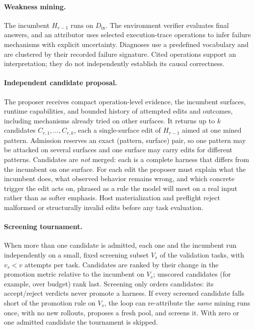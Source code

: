 \paragraph{Weakness mining.}
The incumbent $H_{r-1}$ runs on $D_{\mathrm{in}}$. The environment
verifier evaluates final answers, and an attributor uses selected
execution-trace operations to infer failure mechanisms with explicit
uncertainty. Diagnoses use a predefined vocabulary and are clustered by their
recorded failure signature. Cited operations support an interpretation; they
do not independently establish its causal correctness.

\paragraph{Independent candidate proposal.}
The proposer receives compact operation-level evidence, the incumbent surfaces,
runtime capabilities, and bounded history of attempted edits and outcomes,
including mechanisms already tried on other surfaces. It returns up to $k$
candidates $C_{r,1},\dots,C_{r,k}$, each a single-surface edit of $H_{r-1}$ aimed at
one mined pattern. Admission reserves an exact (pattern, surface) pair, so one
pattern may be attacked on several surfaces and one surface may carry edits for
different patterns. Candidates are \emph{not} merged: each is a complete
harness that differs from the incumbent on one surface. For each edit the
proposer must explain what the incumbent does, what observed behavior remains
wrong, and which concrete trigger the edit acts on, phrased as a rule the model
will meet on a real input rather than as softer emphasis. Host materialization
and preflight reject malformed or structurally invalid edits before any task
evaluation.

\paragraph{Screening tournament.}
When more than one candidate is admitted, each one and the incumbent run
independently on a small, fixed screening subset $V_s$ of the validation tasks,
with $v_s<v$ attempts per task. Candidates are ranked by their change in the
promotion metric relative to the incumbent on $V_s$; unscored candidates (for
example, over budget) rank last. Screening only orders candidates: its
accept/reject verdicts never promote a harness. If every screened candidate
falls short of the promotion rule on $V_s$, the loop can re-attribute the
\emph{same} mining runs once, with no new rollouts, proposes a fresh pool, and
screens it. With zero or one admitted candidate the tournament is skipped.

